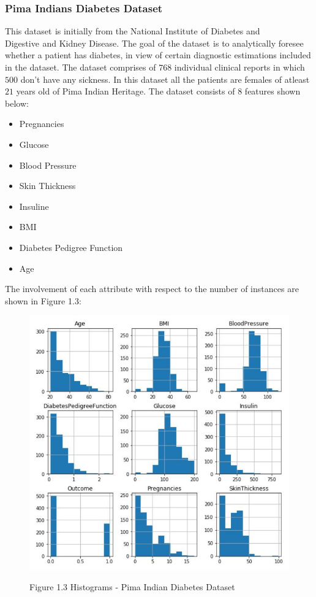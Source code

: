 \documentclass[oneside,12pt]{Classes/VTU}
\begin{document}
	\subsubsection{Pima Indians Diabetes Dataset}
	
	This dataset\tiny\textcolor{white}{s}\normalsize is initially from the National Institute\tiny\textcolor{white}{s}\normalsize of Diabetes and Digestive\tiny\textcolor{white}{s}\normalsize and Kidney Disease. The goal\tiny\textcolor{white}{s}\normalsize of the dataset\tiny\textcolor{white}{s}\normalsize is to analytically foresee whether a patient has diabetes, in view of certain diagnostic estimations included in the dataset. The dataset comprises of $768$ individual clinical reports in which $500$ don't have any sickness. In this dataset all the patients are females of atleast $21$ years old of Pima Indian Heritage. 
	The dataset consists of $8$ features shown below:
	\begin{itemize}
		\item Pregnancies
		\item Glucose
		\item Blood Pressure 
		\item Skin Thickness
		\item Insuline
		\item BMI
		\item Diabetes Pedigree Function
		\item Age
	\end{itemize}
	The involvement of each attribute with respect to the number of instances are shown in Figure 1.3:
	\linebreak
	\begin{figure}	
		\begin{center}
			\includegraphics[scale=0.6]{images/diabeteshistogram.jpeg}
		\end{center}
	
		\begin{center}
			Figure 1.3 Histograms - Pima Indian Diabetes Dataset
		\end{center}
	\end{figure}
\end{document}

